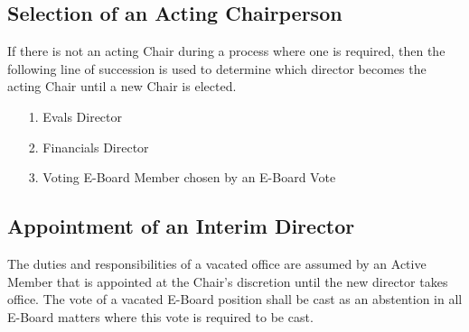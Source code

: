 \documentclass{article}
\newcommand{\asection}[1]{\subsection{#1} \label{#1}}
\begin{document}
\asection{Selection of an Acting Chairperson}
If there is not an acting Chair during a process where one is required, then the following line of succession is used to determine which director becomes the acting Chair until a new Chair is elected.
\begin{enumerate}
	\item[1.] Evals Director
	\item[2.] Financials Director
	\item[3.] Voting E-Board Member chosen by an E-Board Vote
\end{enumerate}

\asection{Appointment of an Interim Director}
The duties and responsibilities of a vacated office are assumed by an Active Member that is appointed at the Chair's discretion until the new director takes office. %
The vote of a vacated E-Board position shall be cast as an abstention in all E-Board matters where this vote is required to be cast.
\end{document}
